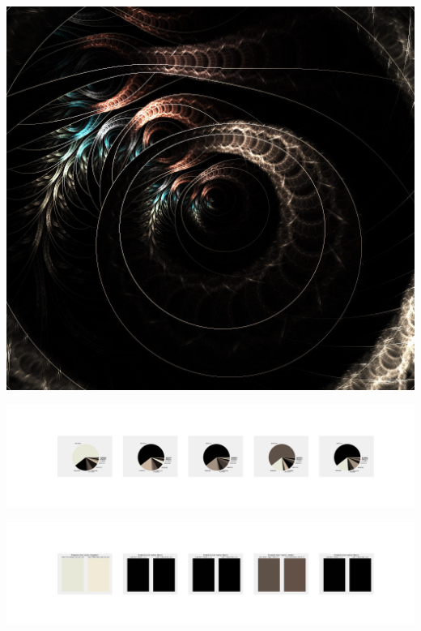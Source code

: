 \documentclass[11pt]{article}
\begin{document}
\begin{landscape}
    \begin{center}
    \includegraphics[width=\textwidth]{./nbimg/file (95).jpg}
    \end{center}

    \begin{center}
    \includegraphics[width=250mm]{./nbimg/pie-446.jpg}
    \end{center}

    \begin{center}
    \includegraphics[width=250mm]{./nbimg/peak-446.jpg}
    \end{center}
    


\end{landscape}
\end{document}
